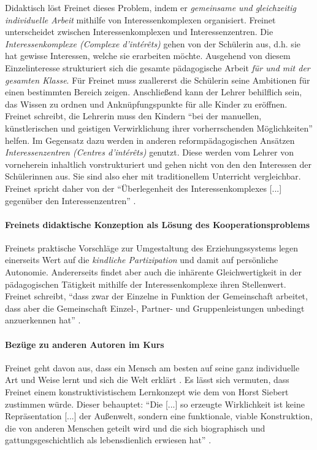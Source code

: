 Didaktisch löst Freinet dieses Problem, indem er \emph{gemeinsame und gleichzeitig individuelle Arbeit} mithilfe von Interessenkomplexen organisiert.
Freinet unterscheidet zwischen Interessenkomplexen und Interessenzentren.
Die \emph{Interessenkomplexe (Complexe d'intérêts)} gehen von der Schülerin aus, d.h. sie hat gewisse Interessen, welche sie erarbeiten möchte.
Ausgehend von diesem Einzelinteresse strukturiert sich die gesamte pädagogische Arbeit \emph{für und mit der gesamten Klasse}.
Für Freinet muss zuallererst die Schülerin seine Ambitionen für einen bestimmten Bereich zeigen.
Anschließend kann der Lehrer behilflich sein, das Wissen zu ordnen und Anknüpfungspunkte für alle Kinder zu eröffnen.
Freinet schreibt, die Lehrerin muss den Kindern ``bei der manuellen, künstlerischen und geistigen Verwirklichung ihrer vorherrschenden Möglichkeiten'' \parencite[~90]{Freinet1979} helfen.
Im Gegensatz dazu werden in anderen reformpädagogischen Ansätzen \emph{Interessenzentren (Centres d'intérêts)} genutzt.
Diese werden vom Lehrer von vorneherein inhaltlich vorstrukturiert und gehen nicht von den den Interessen der Schülerinnen aus.
Sie sind also eher mit traditionellem Unterricht vergleichbar.
Freinet spricht daher von der ``Überlegenheit des Interessenkomplexes [...] gegenüber den Interessenzentren'' \parencite[89]{Freinet1979}.


\paragraph{Freinets didaktische Konzeption als Lösung des Kooperationsproblems}
Freinets praktische Vorschläge zur Umgestaltung des Erziehungssystems legen einerseits Wert auf die \emph{kindliche Partizipation} und damit auf persönliche Autonomie.
Andererseits findet aber auch die inhärente Gleichwertigkeit in der pädagogischen Tätigkeit mithilfe der Interessenkomplexe ihren Stellenwert.
Freinet schreibt, ``dass zwar der Einzelne in Funktion der Gemeinschaft arbeitet, dass aber die Gemeinschaft Einzel-, Partner- und Gruppenleistungen unbedingt anzuerkennen hat'' \parencite[87]{Freinet1979}.


\paragraph{Bezüge zu anderen Autoren im Kurs}

Freinet geht davon aus, dass ein Mensch am besten auf seine ganz individuelle Art und Weise lernt und sich die Welt erklärt \parencite[vgl.][96]{Freinet-2000a}.
Es lässt sich vermuten, dass Freinet einem konstruktivistischem Lernkonzept wie dem von Horst Siebert zustimmen würde.
Dieser behauptet: ``Die [...] so erzeugte Wirklichkeit ist keine Repräsentation [...] der Außenwelt, sondern eine funktionale, viable Konstruktion, die von anderen Menschen geteilt wird und die sich biographisch und gattungsgeschichtlich als lebensdienlich erwiesen hat'' \parencite[6]{siebert-2003}.

